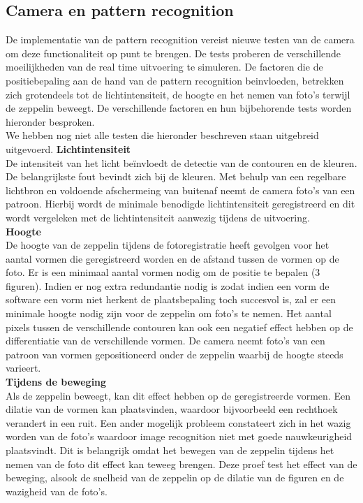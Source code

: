 \documentclass[tt]{penoverslag}
\begin{document}
\subsection{Camera en pattern recognition}
De implementatie van de pattern recognition vereist nieuwe testen van de camera om deze functionaliteit op punt te brengen. De tests proberen de verschillende moeilijkheden van de real time uitvoering te simuleren. De factoren die de positiebepaling aan de hand van de pattern recognition beinvloeden, betrekken zich grotendeels tot de lichtintensiteit, de hoogte en het nemen van foto’s terwijl de zeppelin beweegt. De verschillende factoren en hun bijbehorende tests worden hieronder besproken.
\\
We hebben nog niet alle testen die hieronder beschreven staan uitgebreid uitgevoerd.
\textbf{Lichtintensiteit}\\
De intensiteit van het licht be\"{i}nvloedt de detectie van de contouren en de kleuren. De belangrijkste fout bevindt zich bij de kleuren. Met behulp van een regelbare lichtbron en voldoende afschermeing van buitenaf neemt de camera foto’s van een patroon. Hierbij wordt de minimale benodigde lichtintensiteit geregistreerd en dit wordt vergeleken met de lichtintensiteit aanwezig tijdens de uitvoering. \\
\textbf{Hoogte}\\
De hoogte van de zeppelin tijdens de fotoregistratie heeft gevolgen voor het aantal vormen die geregistreerd worden en de afstand tussen de vormen op de foto. Er is een minimaal aantal vormen nodig om de positie te bepalen (3 figuren). Indien er nog extra redundantie nodig is zodat indien een vorm de software een vorm niet herkent de plaatsbepaling toch succesvol is, zal er een minimale hoogte nodig zijn voor de zeppelin om foto’s te nemen. Het aantal pixels tussen de verschillende contouren kan ook een negatief effect hebben op de differentiatie van de verschillende vormen. De camera neemt foto’s van een patroon van vormen gepositioneerd onder de zeppelin waarbij de hoogte steeds varieert.\\ 
\textbf{Tijdens de beweging}\\
Als de zeppelin beweegt, kan dit effect hebben op de geregistreerde vormen. Een dilatie van de vormen kan plaatsvinden, waardoor bijvoorbeeld een rechthoek verandert in een ruit. Een ander mogelijk probleem constateert zich in het wazig worden van de foto’s waardoor image recognition niet met goede nauwkeurigheid plaatsvindt. Dit is belangrijk omdat het bewegen van de zeppelin tijdens het nemen van de foto dit effect kan teweeg brengen. Deze proef test het effect van de beweging, alsook de snelheid van de zeppelin op de dilatie van de figuren en de wazigheid van de foto’s.  \\
\end{document}
